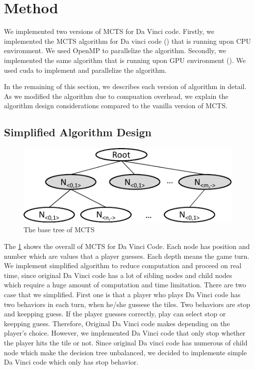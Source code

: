 
\section{Method}
We implemented two versions of MCTS for Da Vinci code. 
Firstly, we implemented the MCTS algorithm for Da vinci code (\cpu) that is running upon CPU environment.
We used OpenMP to parallelize the algorithm.
Secondly, we implemented the same algorithm that is running upon GPU environment (\gpu).
We used cuda to implement and parallelize the algorithm.

In the remaining of this section, we describes each version of algorithm in detail. 
As we modified the algorithm due to compuation overhead, we explain the algorithm design considerations compared to the vanilla version of MCTS.

\subsection{Simplified Algorithm Design}

\begin{figure}
\includegraphics[width=0.95\columnwidth]{figures/base_tree.pdf}
\caption{The base tree of MCTS}
\label{fig:base_tree}
\end{figure}

The \cref{fig:base_tree} shows the overall of MCTS for Da Vinci Code. 
Each node has position and number which are values that a player guesses. Each depth means the game turn. 
We implement simplified algorithm to reduce computation and proceed on real time, since original Da Vinci code has a lot of sibling nodes and child nodes which require a huge amount of computation and time limitation. 
There are two case that we simplified. 
First one is that a player who plays Da Vinci code has two behaviors in each turn, when he/she gussese the tiles. 
Two behaviors are stop and keepping guess. 
If the player guesses correctly, play can select stop or keepping guess. 
Therefore, Original Da Vinci code makes depending on the player's choice. 
However, we implemented Da Vinci code that only stop whether the player hits the tile or not. 
Since original Da vinci code has numerous of child node which make the decision tree unbalanced, we decided to implemente simple Da Vinci code which only has stop behavior.
 
